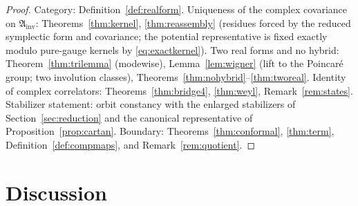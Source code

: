 \documentclass[11pt]{article}
\theoremstyle{definition}
\theoremstyle{remark}
\begin{document}
\begin{proof}
Category: Definition~\ref{def:realform}.  Uniqueness of the complex
covariance on $\mathfrak A_{\mathrm{inv}}$: Theorems~\ref{thm:kernel},
\ref{thm:reassembly} (residues forced by the reduced symplectic form and
covariance; the potential representative is fixed exactly modulo
pure-gauge kernels by \eqref{eq:exactkernel}).  Two real forms and no
hybrid: Theorem~\ref{thm:trilemma} (modewise), Lemma~\ref{lem:wigner}
(lift to the Poincar\'e group; two involution classes),
Theorems~\ref{thm:nohybrid}--\ref{thm:tworeal}.  Identity of complex
correlators: Theorems~\ref{thm:bridge4}, \ref{thm:weyl},
Remark~\ref{rem:states}.  Stabilizer statement: orbit constancy
\cite{companion3} with the enlarged stabilizers of
Section~\ref{sec:reduction} and the canonical representative of
Proposition~\ref{prop:cartan}.  Boundary: Theorems~\ref{thm:conformal},
\ref{thm:term}, Definition~\ref{def:compmaps}, and
Remark~\ref{rem:quotient}.
\end{proof}

\section{Discussion}\label{sec:discussion}
\end{document}
